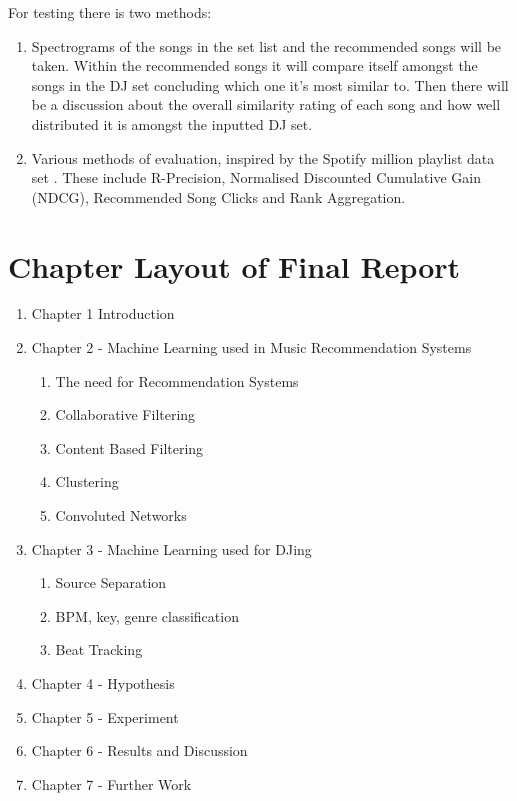 \documentclass[11pt,titlepage,oneside]{book}
\begin{document}
\begin{flushleft}
	For testing there is two methods: 
\end{flushleft}
\begin{enumerate}
	\item Spectrograms of the songs in the set list and the recommended songs will be taken. Within the recommended songs it will compare itself amongst the songs in the DJ set concluding which one it’s most similar to. Then there will be a discussion about the overall similarity rating of each song and how well distributed it is amongst the inputted DJ set.
	\item Various methods of evaluation, inspired by the Spotify million playlist data set \citep{chen_recsys_2018}. These include R-Precision, Normalised Discounted Cumulative Gain (NDCG), Recommended Song Clicks and Rank Aggregation.
\end{enumerate}

\section{Chapter Layout of Final Report}
\begin{enumerate}
	\item Chapter 1 Introduction
	\item Chapter 2 - Machine Learning used in Music Recommendation Systems
	\begin{enumerate}
		\item The need for Recommendation Systems
		\item Collaborative Filtering
		\item Content Based Filtering
		\item Clustering
		\item Convoluted Networks
	\end{enumerate}
	\item Chapter 3 - Machine Learning used for DJing
	\begin{enumerate}
		\item Source Separation
		\item BPM, key, genre classification
		\item Beat Tracking 
	\end{enumerate}
	\item Chapter 4 - Hypothesis
	\item Chapter 5 - Experiment
	\item Chapter 6 - Results and Discussion
	\item Chapter 7 - Further Work
	
\end{enumerate}


\end{document}
